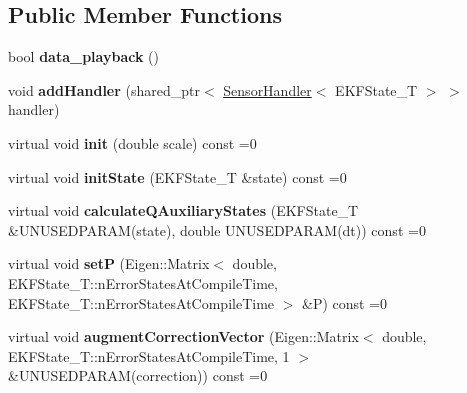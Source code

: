 \subsection*{Public Member Functions}
\begin{DoxyCompactItemize}
\item 
\hypertarget{classmsf__core_1_1MSF__SensorManager_a50c42d9ed661147254d94c603b09691f}{bool {\bfseries data\-\_\-playback} ()}\label{classmsf__core_1_1MSF__SensorManager_a50c42d9ed661147254d94c603b09691f}

\item 
\hypertarget{classmsf__core_1_1MSF__SensorManager_a106ff842a5280f1799505a7203ad2c08}{void {\bfseries add\-Handler} (shared\-\_\-ptr$<$ \hyperlink{classmsf__core_1_1SensorHandler}{Sensor\-Handler}$<$ E\-K\-F\-State\-\_\-\-T $>$ $>$ handler)}\label{classmsf__core_1_1MSF__SensorManager_a106ff842a5280f1799505a7203ad2c08}

\item 
\hypertarget{classmsf__core_1_1MSF__SensorManager_a170802bb97dfc3afb931fd1d7779e3ac}{virtual void {\bfseries init} (double scale) const =0}\label{classmsf__core_1_1MSF__SensorManager_a170802bb97dfc3afb931fd1d7779e3ac}

\item 
\hypertarget{classmsf__core_1_1MSF__SensorManager_a326567c3181be5b0854b294431aa69ff}{virtual void {\bfseries init\-State} (E\-K\-F\-State\-\_\-\-T \&state) const =0}\label{classmsf__core_1_1MSF__SensorManager_a326567c3181be5b0854b294431aa69ff}

\item 
\hypertarget{classmsf__core_1_1MSF__SensorManager_afc9c8189b990db3c00df9bc239ff14e8}{virtual void {\bfseries calculate\-Q\-Auxiliary\-States} (E\-K\-F\-State\-\_\-\-T \&U\-N\-U\-S\-E\-D\-P\-A\-R\-A\-M(state), double U\-N\-U\-S\-E\-D\-P\-A\-R\-A\-M(dt)) const =0}\label{classmsf__core_1_1MSF__SensorManager_afc9c8189b990db3c00df9bc239ff14e8}

\item 
\hypertarget{classmsf__core_1_1MSF__SensorManager_a586c046dc1ffbe4f236c7c4413a8dc82}{virtual void {\bfseries set\-P} (Eigen\-::\-Matrix$<$ double, E\-K\-F\-State\-\_\-\-T\-::n\-Error\-States\-At\-Compile\-Time, E\-K\-F\-State\-\_\-\-T\-::n\-Error\-States\-At\-Compile\-Time $>$ \&P) const =0}\label{classmsf__core_1_1MSF__SensorManager_a586c046dc1ffbe4f236c7c4413a8dc82}

\item 
\hypertarget{classmsf__core_1_1MSF__SensorManager_a9f69dacac4e600a524691dd4c17f94a0}{virtual void {\bfseries augment\-Correction\-Vector} (Eigen\-::\-Matrix$<$ double, E\-K\-F\-State\-\_\-\-T\-::n\-Error\-States\-At\-Compile\-Time, 1 $>$ \&U\-N\-U\-S\-E\-D\-P\-A\-R\-A\-M(correction)) const =0}\label{classmsf__core_1_1MSF__SensorManager_a9f69dacac4e600a524691dd4c17f94a0}


\end{DoxyCompactItemize}
